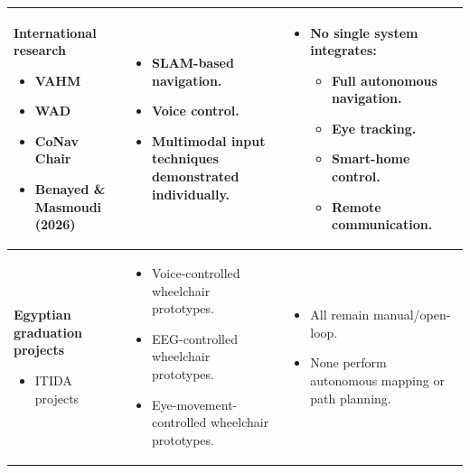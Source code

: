 \begin{table}[H]
\begin{tabular}{|>{\raggedright\arraybackslash}p{2.8cm}|
                >{\raggedright\arraybackslash}p{5.4cm}|
                >{\raggedright\arraybackslash}p{5.4cm}|}
\textbf{International research}
\begin{itemize}[leftmargin=*,nosep]
    \item VAHM
    \item WAD
    \item CoNav Chair
    \item Benayed \& Masmoudi (2026)
\end{itemize}
&
\begin{itemize}[leftmargin=*,nosep]
    \item SLAM-based navigation.
    \item Voice control.
    \item Multimodal input techniques demonstrated individually.
\end{itemize}
&
\begin{itemize}[leftmargin=*,nosep]
    \item No single system integrates:
    \begin{itemize}[leftmargin=*,nosep]
        \item Full autonomous navigation.
        \item Eye tracking.
        \item Smart-home control.
        \item Remote communication.
    \end{itemize}
\end{itemize}
\\
\hline

\textbf{Egyptian graduation projects}
\begin{itemize}[leftmargin=*,nosep]
    \item ITIDA projects~\cite{itida2021gradprojects}
\end{itemize}
&
\begin{itemize}[leftmargin=*,nosep]
    \item Voice-controlled wheelchair prototypes.
    \item EEG-controlled wheelchair prototypes.
    \item Eye-movement-controlled wheelchair prototypes.
\end{itemize}
&
\begin{itemize}[leftmargin=*,nosep]
    \item All remain manual/open-loop.
    \item None perform autonomous mapping or path planning.
\end{itemize}
\\
\hline

\end{tabular}
\end{table}

